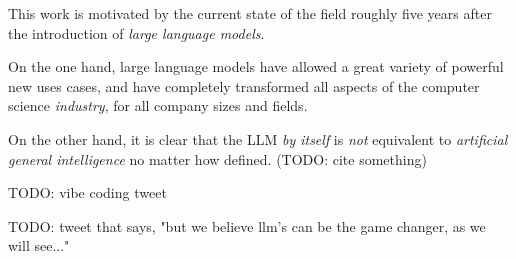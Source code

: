 \label{sec:contributions}
This work is motivated by the current state of the field roughly five years after the introduction of {\em large language models}.

On the one hand, large language models have allowed a great variety of powerful new uses cases, and have completely transformed all aspects of the computer science {\em industry}, for all company sizes and fields.

On the other hand, it is clear that the LLM {\em by itself} is {\em not} equivalent to {\em artificial general intelligence} no matter how defined. (TODO: cite something)

TODO: vibe coding tweet

TODO: tweet that says, "but we believe llm's can be the game changer, as we will see..."